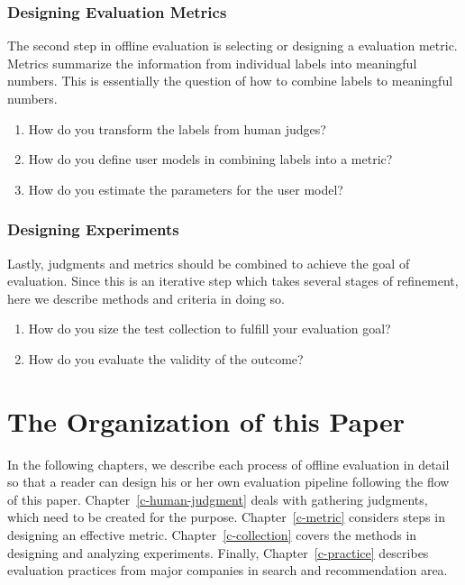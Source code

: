 \subsubsection{Designing Evaluation Metrics}

The second step in offline evaluation is selecting or designing a  evaluation metric. Metrics summarize the information from individual labels into meaningful numbers. This is essentially the question of how to combine labels to meaningful numbers.

\begin{enumerate}
	\item How do you transform the labels from human judges?
	\item How do you define user models in combining labels into a metric?
	\item How do you estimate the parameters for the user model?
\end{enumerate}

\subsubsection{Designing Experiments}


Lastly, judgments and metrics should be combined to achieve the goal of evaluation. Since this is an iterative step which takes several stages of refinement, here we describe methods and criteria in doing so. 

\begin{enumerate}
	\item How do you size the test collection to fulfill your evaluation goal?
	\item How do you evaluate the validity of the outcome?
\end{enumerate}


\section{The Organization of this Paper}

In the following chapters, we describe each process of offline evaluation in detail so that a reader can design his or her own evaluation pipeline following the flow of this paper. Chapter~\ref{c-human-judgment} deals with gathering judgments, which need to be created for the purpose. Chapter~\ref{c-metric} considers steps in designing an effective metric. Chapter~\ref{c-collection} covers the methods in designing and analyzing experiments. Finally, Chapter~\ref{c-practice} describes evaluation practices from major companies in search and recommendation area.

